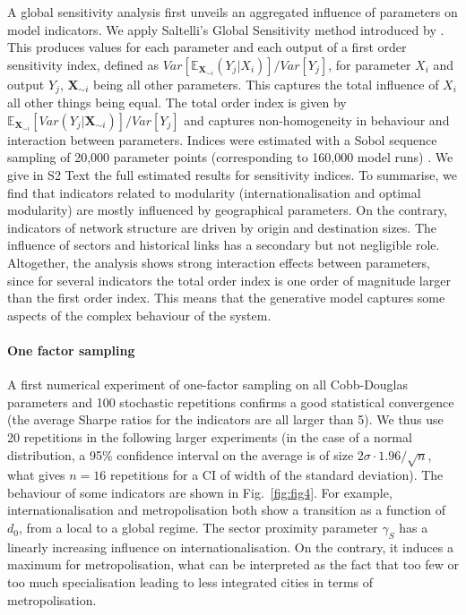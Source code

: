 \documentclass[10pt,letterpaper]{article}
\begin{document}
A global sensitivity analysis first unveils an aggregated influence of parameters on model indicators. We apply Saltelli's Global Sensitivity method introduced by \cite{saltelli2008global}. This produces values for each parameter and each output of a first order sensitivity index, defined as $Var\left[\mathbb{E}_{\mathbf{X}_{\sim i}}\left(Y_j | X_i\right)\right] / Var\left[Y_j\right]$, for parameter $X_i$ and output $Y_j$, $\mathbf{X}_{\sim i}$ being all other parameters. This captures the total influence of $X_i$ all other things being equal. The total order index is given by $\mathbb{E}_{\mathbf{X}_{\sim i}} \left[Var(Y_j | \mathbf{X}_{\sim i})\right] / Var\left[Y_j\right]$ and captures non-homogeneity in behaviour and interaction between parameters. Indices were estimated with a Sobol sequence sampling of 20,000 parameter points (corresponding to 160,000 model runs) \cite{saltelli2010variance}. We give in S2 Text the full estimated results for sensitivity indices. To summarise, we find that indicators related to modularity (internationalisation and optimal modularity) are mostly influenced by geographical parameters. On the contrary, indicators of network structure are driven by origin and destination sizes. The influence of sectors and historical links has a secondary but not negligible role. Altogether, the analysis shows strong interaction effects between parameters, since for several indicators the total order index is one order of magnitude larger than the first order index. This means that the generative model captures some aspects of the complex behaviour of the system.



\paragraph{One factor sampling}

A first numerical experiment of one-factor sampling on all Cobb-Douglas parameters and 100 stochastic repetitions confirms a good statistical convergence (the average Sharpe ratios for the indicators are all larger than 5). We thus use 20 repetitions in the following larger experiments (in the case of a normal distribution, a 95\% confidence interval on the average is of size $2\sigma \cdot 1.96 / \sqrt{n}$, what gives $n=16$ repetitions for a CI of width of the standard deviation). The behaviour of some indicators are shown in Fig.~\ref{fig:fig4}. For example, internationalisation and metropolisation both show a transition as a function of $d_0$, from a local to a global regime. The sector proximity parameter $\gamma_S$ has a linearly increasing influence on internationalisation. On the contrary, it induces a maximum for metropolisation, what can be interpreted as the fact that too few or too much specialisation leading to less integrated cities in terms of metropolisation.
\end{document}
